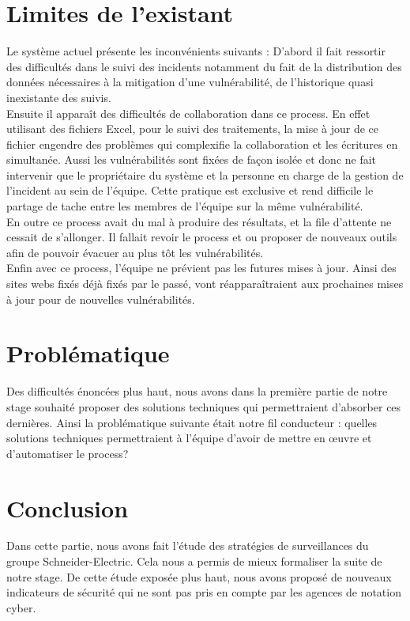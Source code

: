 \documentclass[a4paper,12pt]{book}
\theoremstyle{break}
\begin{document}
\section{Limites de l'existant}
Le système actuel présente les inconvénients suivants : 
D’abord il fait ressortir des difficultés dans le suivi des incidents notamment du fait de la distribution des données nécessaires à la mitigation d'une vulnérabilité, de l’historique quasi inexistante des suivis. 
\\
Ensuite il apparaît des difficultés de collaboration dans ce process. En effet utilisant des fichiers Excel, pour le suivi des traitements, la mise à jour de ce fichier engendre des problèmes qui complexifie la collaboration et les écritures en simultanée. Aussi les vulnérabilités sont fixées de façon isolée et donc ne fait intervenir que le propriétaire du système et la personne en charge de la gestion de l’incident au sein de l’équipe. Cette pratique est exclusive et rend difficile le partage de tache entre les membres de l’équipe sur la même vulnérabilité. 
\\
En outre ce process avait du mal à produire des résultats, et la file d'attente ne cessait de s'allonger. Il fallait revoir le process et ou proposer de nouveaux outils afin de pouvoir évacuer au plus tôt les vulnérabilités. 
\\
Enfin avec ce process, l’équipe ne prévient pas les futures mises à jour. Ainsi des sites webs fixés déjà fixés par le passé, vont réapparaîtraient aux prochaines mises à jour pour de nouvelles vulnérabilités.

\section{Problématique}
Des difficultés énoncées plus haut, nous avons dans la première partie de notre stage souhaité proposer des solutions techniques qui permettraient d’absorber ces dernières. Ainsi la problématique suivante était notre fil conducteur : quelles solutions techniques permettraient à l'équipe d'avoir de mettre en  œuvre et d'automatiser le process? 

\section*{Conclusion}
Dans cette partie, nous avons fait l'étude des stratégies de surveillances du groupe Schneider-Electric. Cela nous a permis de mieux formaliser la suite de notre stage. De cette étude exposée plus haut, nous avons proposé de nouveaux indicateurs de sécurité qui ne sont pas pris en compte par les agences de notation cyber. 
\end{document}
